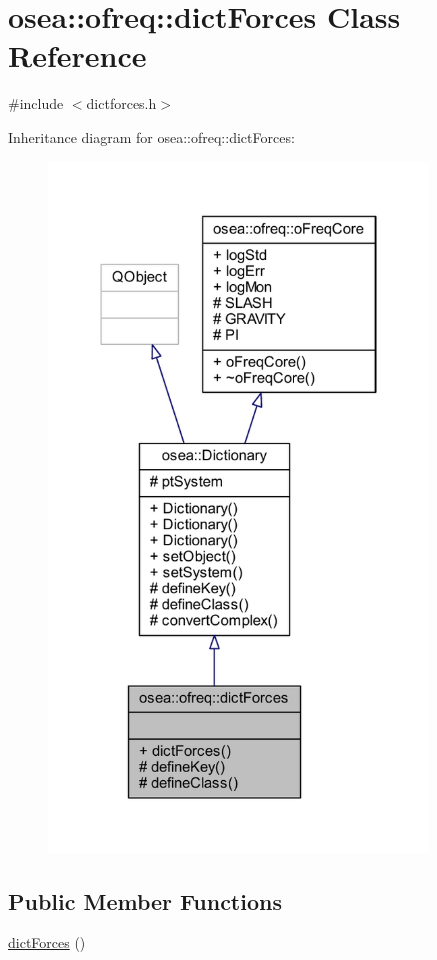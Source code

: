 \hypertarget{classosea_1_1ofreq_1_1dict_forces}{\section{osea\-:\-:ofreq\-:\-:dict\-Forces Class Reference}
\label{classosea_1_1ofreq_1_1dict_forces}
}


{\ttfamily \#include $<$dictforces.\-h$>$}



Inheritance diagram for osea\-:\-:ofreq\-:\-:dict\-Forces\-:
\nopagebreak
\begin{figure}[H]
\begin{center}
\leavevmode
\includegraphics[width=286pt]{classosea_1_1ofreq_1_1dict_forces__inherit__graph}
\end{center}
\end{figure}
\subsection*{Public Member Functions}
\begin{DoxyCompactItemize}
\item 
\hyperlink{classosea_1_1ofreq_1_1dict_forces_ae9af9b8247c5b69d3041167ff1f898c6}{dict\-Forces} ()
\end{DoxyCompactItemize}
